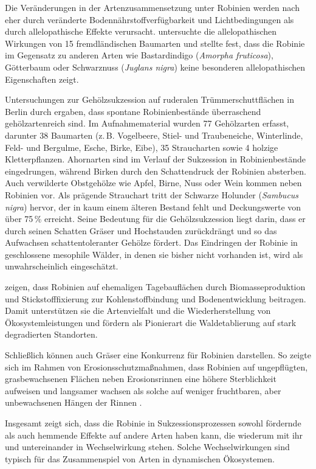 \documentclass[twocolumn]{scrartcl}
\begin{document}
Die Veränderungen in der Artenzusammensetzung unter Robinien werden
nach \citet{vitkova2017robinie} eher durch veränderte
Bodennährstoffverfügbarkeit und Lichtbedingungen als durch
allelopathische Effekte verursacht. \citet{csiszar2009allelopathy}
untersuchte die allelopathischen Wirkungen von 15 fremdländischen
Baumarten und stellte fest, dass die Robinie im Gegensatz zu anderen
Arten wie Bastardindigo (\emph{Amorpha fruticosa}), Götterbaum oder
Schwarznuss (\emph{Juglans nigra}) keine besonderen allelopathischen
Eigenschaften zeigt.

Untersuchungen zur Gehölzsukzession auf ruderalen Trümmerschuttflächen
in Berlin durch \citet{kowarik1990robinie} ergaben, dass spontane
Robinienbestände überraschend gehölzartenreich sind. Im
Aufnahmematerial wurden 77 Gehölzarten erfasst, darunter 38 Baumarten
(z.\,B. Vogelbeere, Stiel- und Traubeneiche, Winterlinde, Feld- und
Bergulme, Esche, Birke, Eibe), 35 Straucharten sowie 4 holzige
Kletterpflanzen. Ahornarten sind im Verlauf der Sukzession in
Robinienbestände eingedrungen, während Birken durch den Schattendruck
der Robinien absterben. Auch verwilderte Obstgehölze wie Apfel, Birne,
Nuss oder Wein kommen neben Robinien vor. Als prägende Strauchart
tritt der Schwarze Holunder (\emph{Sambucus nigra}) hervor, der in
kaum einem älteren Bestand fehlt und Deckungswerte von über 75\,\%
erreicht. Seine Bedeutung für die Gehölzsukzession liegt darin, dass
er durch seinen Schatten Gräser und Hochstauden zurückdrängt und so
das Aufwachsen schattentoleranter Gehölze fördert. Das Eindringen der
Robinie in geschlossene mesophile Wälder, in denen sie bisher nicht
vorhanden ist, wird als unwahrscheinlich eingeschätzt.

\citet{evans2013robinie} zeigen, dass Robinien auf ehemaligen
Tagebauflächen durch Biomasseproduktion und Stickstofffixierung zur
Kohlenstoffbindung und Bodenentwicklung beitragen. Damit unterstützen
sie die Artenvielfalt und die Wiederherstellung von
Ökosystemleistungen und fördern als Pionierart die Waldetablierung auf
stark degradierten Standorten.

Schließlich können auch Gräser eine Konkurrenz für Robinien
darstellen. So zeigte sich im Rahmen von Erosionsschutzmaßnahmen, dass
Robinien auf ungepflügten, grasbewachsenen Flächen neben
Erosionsrinnen eine höhere Sterblichkeit aufweisen und langsamer
wachsen als solche auf weniger fruchtbaren, aber unbewachsenen Hängen
der Rinnen \citep{meginnis1934robinie, cooper1950blacklocust}.

Insgesamt zeigt sich, dass die Robinie in Sukzessionsprozessen sowohl
fördernde als auch hemmende Effekte auf andere Arten haben kann, die
wiederum mit ihr und untereinander in Wechselwirkung stehen. Solche
Wechselwirkungen sind typisch für das Zusammenspiel von Arten in
dynamischen Ökosystemen.
\end{document}
